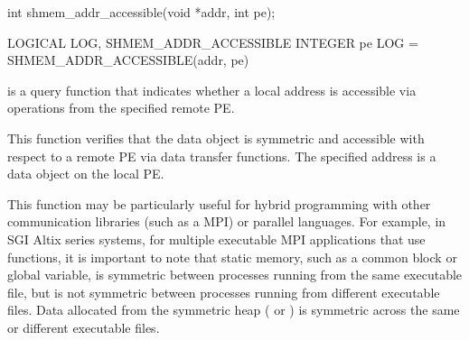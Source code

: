\synC
int shmem_addr_accessible(void *addr, int pe); %

\synF
LOGICAL LOG, SHMEM_ADDR_ACCESSIBLE
INTEGER pe
LOG = SHMEM_ADDR_ACCESSIBLE(addr, pe) %


{
        is a query function that indicates whether a
       local address is accessible via \openshmem operations from the specified
       remote \ac{PE}. 
       
       This function verifies that the data object is symmetric and accessible
       with respect to a remote \ac{PE} via \openshmem  data  transfer  functions.  The
       specified address  is a data object on the local \ac{PE}. 
       
       This function may be particularly useful for hybrid programming with 
       other communication libraries (such as a \ac{MPI}) or parallel languages. 
       For example, in SGI Altix series systems, for multiple executable MPI applications
       that use \openshmem functions, it is important to note that static memory,
       such as a \Fortran{} common block or \Clang{} global variable, is symmetric
       between processes running from the same executable file, but is not
       symmetric between processes running from different executable files.
       Data allocated from the symmetric heap ( or ) is
       symmetric across the same or different executable files.
}
{
}
\eAPI
